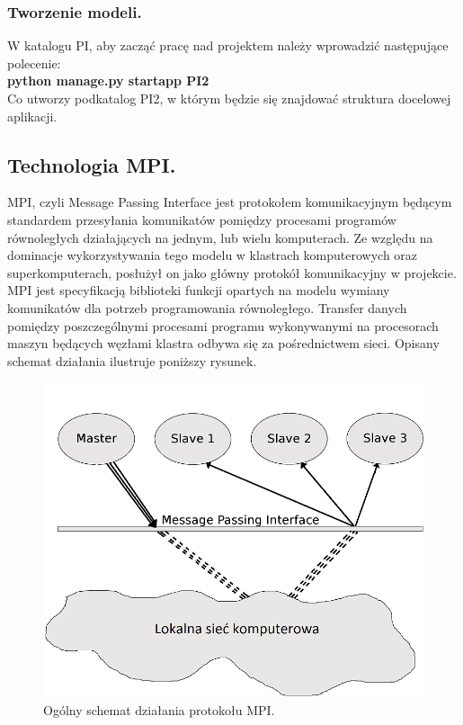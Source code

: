 \documentclass[a4paper,12pt]{article}		%
\begin{document}
\subsubsection{Tworzenie modeli.}
W katalogu PI, aby zacząć pracę nad projektem należy wprowadzić następujące polecenie:\\
\textbf{python manage.py startapp PI2}\\
Co utworzy podkatalog PI2, w którym będzie się znajdować struktura docelowej aplikacji.
\subsection{Technologia MPI.}
MPI, czyli Message Passing Interface jest protokołem komunikacyjnym będącym standardem przesyłania komunikatów pomiędzy procesami programów równoległych działających na jednym, lub wielu komputerach. Ze względu na dominacje wykorzystywania tego modelu w klastrach komputerowych oraz superkomputerach, posłużył on jako główny protokół komunikacyjny w projekcie.
MPI jest specyfikacją biblioteki funkcji opartych na modelu wymiany komunikatów dla potrzeb programowania równoległego. Transfer danych pomiędzy poszczególnymi procesami programu wykonywanymi na procesorach maszyn będących węzłami klastra odbywa się za pośrednictwem sieci. Opisany schemat działania ilustruje poniższy rysunek.

\begin{figure}[h!]
\centering
\includegraphics[scale=0.6]{Resources/mpi.jpg}
\caption{Ogólny schemat działania protokołu MPI.} 
\end{figure}
\end{document}
